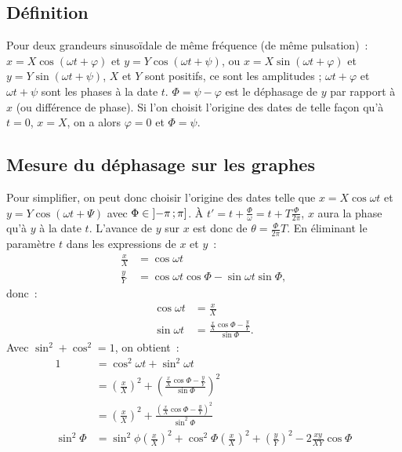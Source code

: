     \subsection{Définition}
            Pour deux grandeurs sinusoïdale de même fréquence (de même pulsation)~: $x = X\cos(\omega t + \varphi)$ et $y = Y\cos(\omega t + \psi)$, ou $x = X\sin(\omega t + \varphi)$ et $y = Y\sin(\omega t + \psi)$, $X$ et $Y$ sont positifs, ce sont les amplitudes ; $\omega t + \varphi$ et $\omega t + \psi$ sont les phases à la date $t$. $\Phi = \psi -\varphi$ est le déphasage de $y$ par rapport à $x$ (ou différence de phase).
            Si l'on choisit l'origine des dates de telle façon qu'à $t=0$, $x=X$, on a alors $\varphi=0$ et $\Phi = \psi$.
    \subsection{Mesure du déphasage sur les graphes}
            Pour simplifier, on peut donc choisir l'origine des dates telle que $x = X\cos \omega t$ et $y=Y\cos(\omega t + \Psi)$ avec $\Phi \in \left] -\pi \, ;  \pi \right]$. À $t' = t + \frac{\Phi}{\omega} = t + T\frac{\Phi}{2\pi}$, $x$ aura la phase qu'à $y$ à la date $t$. L'avance de $y$ sur $x$ est donc de $\theta = \frac{\Phi}{2\pi} T$.
            En éliminant le paramètre $t$ dans les expressions de $x$ et $y$~:
            \begin{align}
                \frac{x}{X} &= \cos\omega t \\
                \frac{y}{Y} &= \cos\omega t \cos\Phi -\sin\omega t \sin\Phi,
            \end{align}
            donc~:
            \begin{align}
                \cos\omega t &= \frac{x}{X} \\
                \sin\omega t &= \frac{\frac{x}{X}\cos\Phi - \frac{y}{Y}}{\sin\Phi}.
            \end{align}
            Avec $\sin^2+\cos^2=1$, on obtient~:
            \begin{align}
                1 &= \cos^2\omega t + \sin^2\omega t \\
                  &= \left(\frac{x}{X}\right)^2 + \left( \frac{\frac{x}{X}\cos\Phi - \frac{y}{Y}}{\sin\Phi} \right)^2 \\
                  &= \left(\frac{x}{X}\right)^2 + \frac{(\frac{x}{X}\cos\Phi - \frac{y}{Y})^2}{\sin^2\Phi} \\
       \sin^2\Phi &= \sin^2\phi \left(\frac{x}{X}\right)^2 + \cos^2\Phi \left(\frac{x}{X}\right)^2 + \left(\frac{y}{Y}\right)^2 - 2 \frac{xy}{XY} \cos\Phi
            \end{align}
